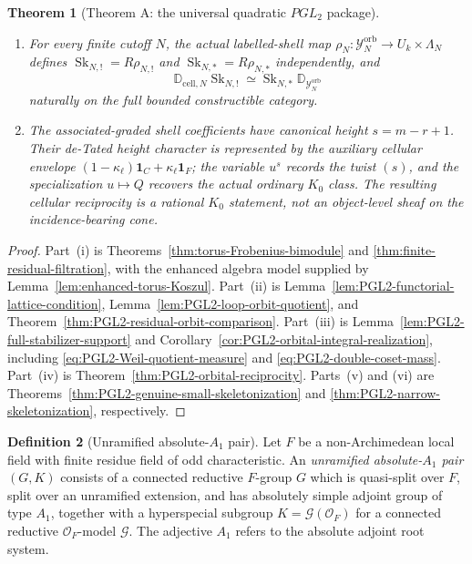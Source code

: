 \documentclass[11pt]{article}
\newtheorem{theorem}{Theorem}[section]
\theoremstyle{definition}
\newtheorem{definition}[theorem]{Definition}
\theoremstyle{remark}
\newcommand{\Uk}{U_k}
\newcommand{\kappaell}{\kappa_{\ell}}
\newcommand{\one}{\mathbf 1}
\newcommand{\D}{\mathbb D}
\newcommand{\Sk}{\operatorname{Sk}}
\newcommand{\cO}{\mathcal O}
\begin{document}
\begin{theorem}[Theorem A: the universal quadratic $PGL_2$ package]
\begin{enumerate}[label=\textup{(\roman*)}]
  dimension-normalized coefficient duality of
  \eqref{eq:normalized-U-duality}.
\item For every finite cutoff $N$, the actual labelled-shell map
  $\rho_N:\mathscr Y_N^{\mathrm{orb}}\to \Uk\times\Lambda_N$ defines
  $\Sk_{N,!}=R\rho_{N,!}$ and $\Sk_{N,*}=R\rho_{N,*}$ independently, and
  \[
   \D_{\mathrm{cell},N}\Sk_{N,!}
   \simeq
   \Sk_{N,*}\D_{\mathscr Y_N^{\mathrm{orb}}}
  \]
  naturally on the full bounded constructible category.
\item The associated-graded shell coefficients have canonical height
  $s=m-r+1$.  Their de-Tated height character is represented by the auxiliary
  cellular envelope
  $(1-\kappaell)\one_C+\kappaell\one_F$; the variable $u^s$ records the twist
  $(s)$, and the specialization $u\mapsto Q$ recovers the actual ordinary
  $K_0$ class.  The resulting cellular reciprocity is a rational $K_0$
  statement, not an object-level sheaf on the incidence-bearing cone.
\end{enumerate}
\end{theorem}

\begin{proof}
Part~\textup{(i)} is Theorems~\ref{thm:torus-Frobenius-bimodule} and
\ref{thm:finite-residual-filtration}, with the enhanced algebra model supplied
by Lemma~\ref{lem:enhanced-torus-Koszul}.  Part~\textup{(ii)} is
Lemma~\ref{lem:PGL2-functorial-lattice-condition},
Lemma~\ref{lem:PGL2-loop-orbit-quotient}, and
Theorem~\ref{thm:PGL2-residual-orbit-comparison}.  Part~\textup{(iii)} is
Lemma~\ref{lem:PGL2-full-stabilizer-support} and
Corollary~\ref{cor:PGL2-orbital-integral-realization}, including
\eqref{eq:PGL2-Weil-quotient-measure} and
\eqref{eq:PGL2-double-coset-mass}.  Part~\textup{(iv)} is
Theorem~\ref{thm:PGL2-orbital-reciprocity}.  Parts~\textup{(v)} and
\textup{(vi)} are Theorems~\ref{thm:PGL2-genuine-small-skeletonization} and
\ref{thm:PGL2-narrow-skeletonization}, respectively.
\end{proof}

\begin{definition}[Unramified absolute-$A_1$ pair]
\label{def:A1-pair}
Let $F$ be a non-Archimedean local field with finite residue field of odd
characteristic.  An \emph{unramified absolute-$A_1$ pair} $(G,K)$ consists of
a connected reductive $F$-group $G$ which is quasi-split over $F$, split over
an unramified extension, and has absolutely simple adjoint group of type
$A_1$, together with a hyperspecial subgroup
$K=\mathcal G(\cO_F)$ for a connected reductive $\cO_F$-model $\mathcal G$.
The adjective $A_1$ refers to the absolute adjoint root system.
\end{definition}
\end{document}
